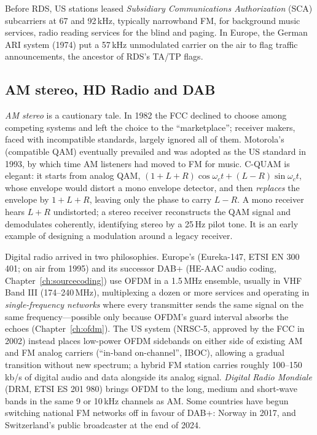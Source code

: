 
Before RDS, US stations leased \emph{Subsidiary Communications Authorization} (SCA) subcarriers at 67 and
92\,kHz, typically narrowband FM, for background music services, radio reading services for the blind and
paging. In Europe, the German ARI system (1974) put a 57\,kHz unmodulated carrier on the air to flag traffic
announcements, the ancestor of RDS's TA/TP flags.

\subsection{AM stereo, HD Radio and DAB}
\label{sec:ch04:digitalradio}

\emph{AM stereo} is a cautionary tale. In 1982 the FCC declined to choose among competing systems and left the
choice to the ``marketplace''; receiver makers, faced with incompatible standards, largely ignored all of
them. Motorola's  (compatible QAM) eventually prevailed and was adopted as the US standard in
1993, by which time AM listeners had moved to FM for music. C-QUAM is elegant: it starts from analog QAM,
$(1+L+R)\cos\omega_ct+(L-R)\sin\omega_ct$, whose envelope would distort a mono envelope detector, and then
\emph{replaces} the envelope by $1+L+R$, leaving only the phase to carry $L-R$. A mono receiver hears $L+R$
undistorted; a stereo receiver reconstructs the QAM signal and demodulates coherently, identifying stereo by
a 25\,Hz pilot tone. It is an early example of designing a modulation around a legacy receiver.

Digital radio arrived in two philosophies. Europe's  (Eureka-147, ETSI EN 300 401; on air from
1995) and its successor DAB+ (HE-AAC audio coding, Chapter~\ref{ch:sourcecoding}) use OFDM in a 1.5\,MHz
ensemble, usually in VHF Band III (174--240\,MHz), multiplexing a dozen or more services and operating in
\emph{single-frequency networks} where every transmitter sends the same signal on the same
frequency---possible only because OFDM's guard interval absorbs the echoes (Chapter~\ref{ch:ofdm}). The US
 system (NRSC-5, approved by the FCC in 2002) instead places low-power OFDM sidebands on either
side of existing AM and FM analog carriers (``in-band on-channel'', IBOC), allowing a gradual transition
without new spectrum; a hybrid FM station carries roughly 100--150\,kb/s of digital audio and data alongside
its analog signal. \emph{Digital Radio Mondiale} (DRM, ETSI ES 201 980) brings OFDM to the long, medium and
short-wave bands in the same 9 or 10\,kHz channels as AM. Some countries have begun switching national FM
networks off in favour of DAB+: Norway in 2017, and Switzerland's public broadcaster at the end of 2024.

